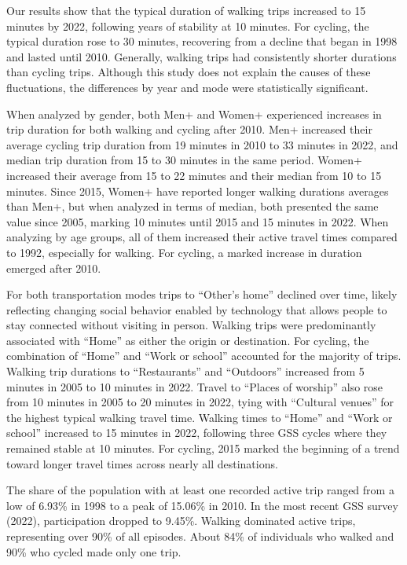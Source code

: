 \documentclass[preprint, 3p,
authoryear]{elsarticle} %
\begin{document}
Our results show that the typical duration of walking trips increased to
15 minutes by 2022, following years of stability at 10 minutes. For
cycling, the typical duration rose to 30 minutes, recovering from a
decline that began in 1998 and lasted until 2010. Generally, walking
trips had consistently shorter durations than cycling trips. Although
this study does not explain the causes of these fluctuations, the
differences by year and mode were statistically significant.

When analyzed by gender, both Men+ and Women+ experienced increases in
trip duration for both walking and cycling after 2010. Men+ increased
their average cycling trip duration from 19 minutes in 2010 to 33
minutes in 2022, and median trip duration from 15 to 30 minutes in the
same period. Women+ increased their average from 15 to 22 minutes and
their median from 10 to 15 minutes. Since 2015, Women+ have reported
longer walking durations averages than Men+, but when analyzed in terms
of median, both presented the same value since 2005, marking 10 minutes
until 2015 and 15 minutes in 2022. When analyzing by age groups, all of
them increased their active travel times compared to 1992, especially
for walking. For cycling, a marked increase in duration emerged after
2010.

For both transportation modes trips to ``Other's home'' declined over
time, likely reflecting changing social behavior enabled by technology
that allows people to stay connected without visiting in person. Walking
trips were predominantly associated with ``Home'' as either the origin
or destination. For cycling, the combination of ``Home'' and ``Work or
school'' accounted for the majority of trips. Walking trip durations to
``Restaurants'' and ``Outdoors'' increased from 5 minutes in 2005 to 10
minutes in 2022. Travel to ``Places of worship'' also rose from 10
minutes in 2005 to 20 minutes in 2022, tying with ``Cultural venues''
for the highest typical walking travel time. Walking times to ``Home''
and ``Work or school'' increased to 15 minutes in 2022, following three
GSS cycles where they remained stable at 10 minutes. For cycling, 2015
marked the beginning of a trend toward longer travel times across nearly
all destinations.

The share of the population with at least one recorded active trip
ranged from a low of 6.93\% in 1998 to a peak of 15.06\% in 2010. In the
most recent GSS survey (2022), participation dropped to 9.45\%. Walking
dominated active trips, representing over 90\% of all episodes. About
84\% of individuals who walked and 90\% who cycled made only one trip.
\end{document}
